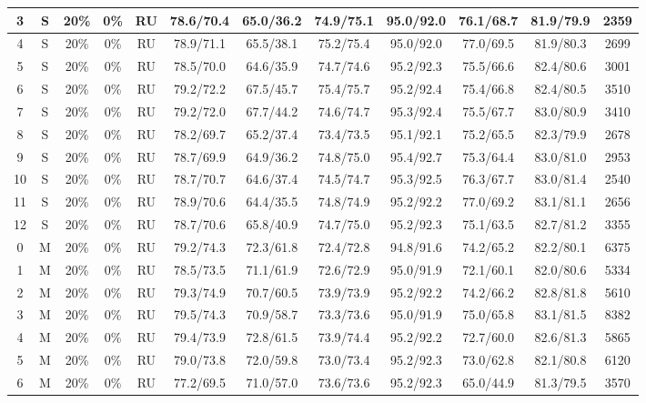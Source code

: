 \begin{table*}
{\begin{tabular}{|c|c|c|c|c||c|c|c|c|c|c||c|}
3 & S & 20\% & 0\% & RU & 78.6/70.4 & 65.0/36.2 & 74.9/75.1 & 95.0/92.0 & 76.1/68.7 & 81.9/79.9 & 2359 \\ \hline
4 & S & 20\% & 0\% & RU & 78.9/71.1 & 65.5/38.1 & 75.2/75.4 & 95.0/92.0 & 77.0/69.5 & 81.9/80.3 & 2699 \\ \hline
5 & S & 20\% & 0\% & RU & 78.5/70.0 & 64.6/35.9 & 74.7/74.6 & 95.2/92.3 & 75.5/66.6 & 82.4/80.6 & 3001 \\ \hline
6 & S & 20\% & 0\% & RU & 79.2/72.2 & 67.5/45.7 & 75.4/75.7 & 95.2/92.4 & 75.4/66.8 & 82.4/80.5 & 3510 \\ \hline
7 & S & 20\% & 0\% & RU & 79.2/72.0 & 67.7/44.2 & 74.6/74.7 & 95.3/92.4 & 75.5/67.7 & 83.0/80.9 & 3410 \\ \hline
8 & S & 20\% & 0\% & RU & 78.2/69.7 & 65.2/37.4 & 73.4/73.5 & 95.1/92.1 & 75.2/65.5 & 82.3/79.9 & 2678 \\ \hline
9 & S & 20\% & 0\% & RU & 78.7/69.9 & 64.9/36.2 & 74.8/75.0 & 95.4/92.7 & 75.3/64.4 & 83.0/81.0 & 2953 \\ \hline
10 & S & 20\% & 0\% & RU & 78.7/70.7 & 64.6/37.4 & 74.5/74.7 & 95.3/92.5 & 76.3/67.7 & 83.0/81.4 & 2540 \\ \hline
11 & S & 20\% & 0\% & RU & 78.9/70.6 & 64.4/35.5 & 74.8/74.9 & 95.2/92.2 & 77.0/69.2 & 83.1/81.1 & 2656 \\ \hline
12 & S & 20\% & 0\% & RU & 78.7/70.6 & 65.8/40.9 & 74.7/75.0 & 95.2/92.3 & 75.1/63.5 & 82.7/81.2 & 3355 \\ \hline
0 & M & 20\% & 0\% & RU & 79.2/74.3 & 72.3/61.8 & 72.4/72.8 & 94.8/91.6 & 74.2/65.2 & 82.2/80.1 & 6375 \\ \hline
1 & M & 20\% & 0\% & RU & 78.5/73.5 & 71.1/61.9 & 72.6/72.9 & 95.0/91.9 & 72.1/60.1 & 82.0/80.6 & 5334 \\ \hline
2 & M & 20\% & 0\% & RU & 79.3/74.9 & 70.7/60.5 & 73.9/73.9 & 95.2/92.2 & 74.2/66.2 & 82.8/81.8 & 5610 \\ \hline
3 & M & 20\% & 0\% & RU & 79.5/74.3 & 70.9/58.7 & 73.3/73.6 & 95.0/91.9 & 75.0/65.8 & 83.1/81.5 & 8382 \\ \hline
4 & M & 20\% & 0\% & RU & 79.4/73.9 & 72.8/61.5 & 73.9/74.4 & 95.2/92.2 & 72.7/60.0 & 82.6/81.3 & 5865 \\ \hline
5 & M & 20\% & 0\% & RU & 79.0/73.8 & 72.0/59.8 & 73.0/73.4 & 95.2/92.3 & 73.0/62.8 & 82.1/80.8 & 6120 \\ \hline
6 & M & 20\% & 0\% & RU & 77.2/69.5 & 71.0/57.0 & 73.6/73.6 & 95.2/92.3 & 65.0/44.9 & 81.3/79.5 & 3570 \\ \hline

\end{tabular}}
\end{table*}
